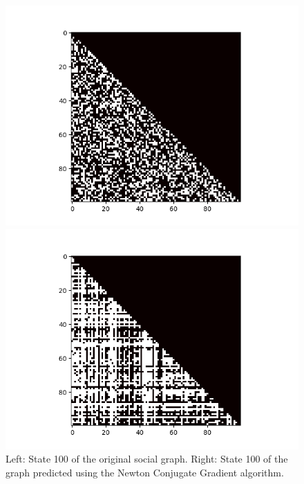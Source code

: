 \begin{figure}
    \begin{minipage}{0.49\textwidth}
        \begin{center}
            \includegraphics[scale=0.5]{figures/original-linear.png}
        \end{center}
    \end{minipage}
    \begin{minipage}{0.49\textwidth}
        \begin{center}
            \includegraphics[scale=0.5]{figures/newton-linear.png}
        \end{center}
    \end{minipage}
	\caption{
        Left: State 100 of the original social graph.
        Right: State 100 of the graph predicted using the Newton Conjugate Gradient algorithm.
	}
    \label{fig:newton-social-linear}
\end{figure}

